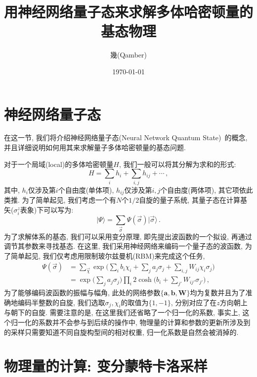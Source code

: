 \documentclass[10pt]{article}
\newcommand{\qket}{\rangle}
\begin{document}
\title{用神经网络量子态来求解多体哈密顿量的基态物理}
\author{幾(Qamber)}
\date{\today}
\maketitle

\tableofcontents
\newpage


\section{神经网络量子态}

在这一节, 我们将介绍神经网络量子态(Neural Network Quantum State)~\cite{Carleo_2017}的概念, 并且详细说明如何用其来求解量子多体哈密顿量的基态问题.

对于一个局域(local)的多体哈密顿量$H$, 我们一般可以将其分解为求和的形式: 
\[ H = \sum_{i} h_{i} + \sum_{i,j} h_{ij} + \cdots\,, \]
其中, $h_{i}$仅涉及第$i$个自由度(单体项), $h_{ij}$仅涉及第$i,j$个自由度(两体项), 其它项依此类推. 
为了简单起见, 我们考虑一个有$N$个$1/2$自旋的量子系统, 其量子态在计算基矢($\sigma_{i}^{z}$表象)下可以写为:
\[ \lvert \Psi \qket = \sum_{\vec{\sigma}} \Psi(\vec{\sigma}) \lvert \vec{\sigma} \qket\,. \]
为了求解体系的基态, 我们可以采用变分原理, 即先提出波函数的一个拟设, 再通过调节其参数来寻找基态. 
在这里, 我们采用神经网络来编码一个量子态的波函数, 为了简单起见, 我们仅考虑用限制玻尔兹曼机(RBM)来完成这个任务, 
\begin{align}
\Psi(\vec{\sigma}) & = \sum_{\vec{\chi}} \exp{\Big(\sum_{i}b_{i}\chi_{i}+\sum_{j}a_{j}\sigma_{j}+\sum_{i,j}W_{ij}\chi_{i}\sigma_{j}\Big)} \nonumber \\
& = \exp{\Big(\sum_{j}a_{j}\sigma_{j}\Big)} \prod_{i} 2 \cosh{\Big(b_{i}+\sum_{j'}W_{ij'}\sigma_{j'}\Big)}\,,
\end{align}
为了能够编码波函数的振幅与幅角, 此处的网络参数$\{\textbf{a},\textbf{b},\textbf{W}\}$均为复数并且为了准确地编码半整数的自旋, 我们选取$\sigma_{j},\chi_{i}$的取值为$\{1,-1\}$, 分别对应了在$z$方向朝上与朝下的自旋. 
需要注意的是, 在这里我们还省略了一个归一化的系数, 事实上, 这个归一化的系数并不会参与到后续的操作中, 
物理量的计算和参数的更新所涉及到的采样只需要知道不同自旋构型间的相对权重, 归一化系数是自然会被消掉的. 


\section{物理量的计算: 变分蒙特卡洛采样}
\end{document}
